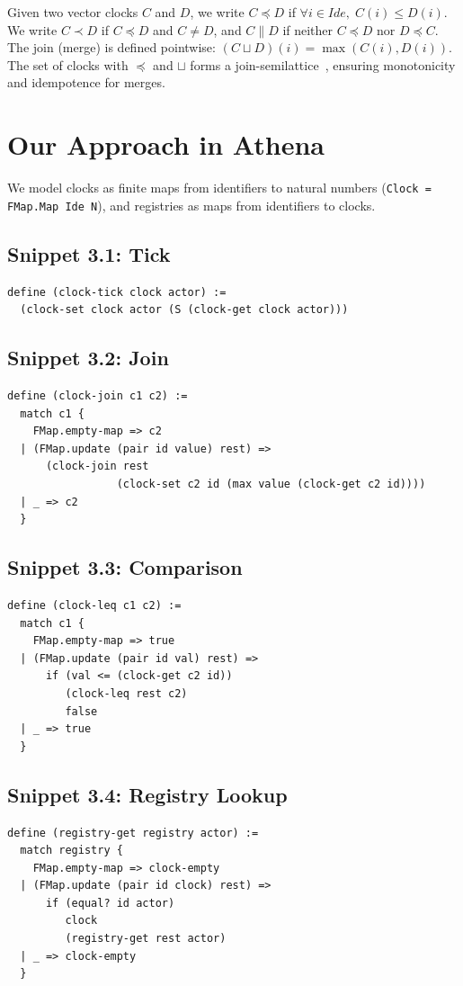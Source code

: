 Given two vector clocks $C$ and $D$, we write $C \preceq D$ if $\forall i \in Ide,\; C(i) \le D(i)$. We write $C \prec D$ if $C \preceq D$ and $C \ne D$, and $C \parallel D$ if neither $C \preceq D$ nor $D \preceq C$. The join (merge) is defined pointwise: $(C \sqcup D)(i) = \max(C(i), D(i))$. The set of clocks with $\preceq$ and $\sqcup$ forms a join-semilattice~\cite{shapiro2011conflict}, ensuring monotonicity and idempotence for merges.

\section{Our Approach in Athena}

We model clocks as finite maps from identifiers to natural numbers (\texttt{Clock = FMap.Map Ide N}), and registries as maps from identifiers to clocks.

\subsection*{Snippet 3.1: Tick}
\begin{lstlisting}[language=Athena,style=athena]
define (clock-tick clock actor) :=
  (clock-set clock actor (S (clock-get clock actor)))
\end{lstlisting}

\subsection*{Snippet 3.2: Join}
\begin{lstlisting}[language=Athena,style=athena]
define (clock-join c1 c2) :=
  match c1 {
    FMap.empty-map => c2
  | (FMap.update (pair id value) rest) =>
      (clock-join rest 
                 (clock-set c2 id (max value (clock-get c2 id))))
  | _ => c2
  }
\end{lstlisting}

\subsection*{Snippet 3.3: Comparison}
\begin{lstlisting}[language=Athena,style=athena]
define (clock-leq c1 c2) :=
  match c1 {
    FMap.empty-map => true
  | (FMap.update (pair id val) rest) =>
      if (val <= (clock-get c2 id))
         (clock-leq rest c2)
         false
  | _ => true
  }
\end{lstlisting}

\subsection*{Snippet 3.4: Registry Lookup}
\begin{lstlisting}[language=Athena,style=athena]
define (registry-get registry actor) :=
  match registry {
    FMap.empty-map => clock-empty
  | (FMap.update (pair id clock) rest) =>
      if (equal? id actor)
         clock
         (registry-get rest actor)
  | _ => clock-empty
  }
\end{lstlisting}

